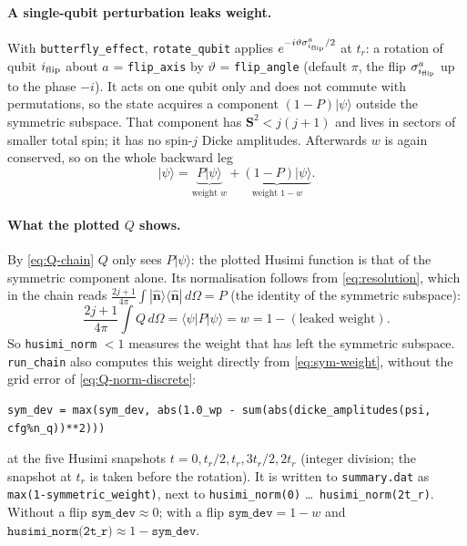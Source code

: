 \documentclass[11pt,a4paper]{article}
\newcommand{\vS}{\bm{S}}
\newcommand{\vn}{\hat{\bm n}}
\begin{document}
\paragraph{A single-qubit perturbation leaks weight.} With \texttt{butterfly\_effect}, \texttt{rotate\_qubit} applies
$e^{-i\vartheta\sigma^a_{i_{\rm flip}}/2}$ at $t_r$: a rotation of qubit $i_{\rm flip}$ about $a$ = \texttt{flip\_axis}
by $\vartheta$ = \texttt{flip\_angle} (default $\pi$, the flip $\sigma^a_{i_{\rm flip}}$ up to the phase $-i$). It acts on
one qubit only and does not commute with permutations, so the state acquires a component $(1-P)|\psi\rangle$ outside the
symmetric subspace. That component has $\vS^2 < j(j+1)$ and lives in sectors of smaller total spin; it has no spin-$j$
Dicke amplitudes. Afterwards $w$ is again conserved, so on the whole backward leg
\begin{equation}
  |\psi\rangle = \underbrace{P|\psi\rangle}_{\text{weight } w} + \underbrace{(1-P)|\psi\rangle}_{\text{weight } 1-w} .
\end{equation}

\paragraph{What the plotted $Q$ shows.} By \eqref{eq:Q-chain} $Q$ only sees $P|\psi\rangle$: the plotted Husimi
function is that of the symmetric component alone. Its normalisation follows from \eqref{eq:resolution}, which in the
chain reads $\frac{2j+1}{4\pi}\int|\vn\rangle\langle\vn|\,d\Omega = P$ (the identity of the symmetric subspace):
\begin{equation}\label{eq:Q-chain-norm}
  \frac{2j+1}{4\pi}\int Q\,d\Omega = \langle\psi|P|\psi\rangle = w = 1 - (\text{leaked weight}) .
\end{equation}
So \texttt{husimi\_norm} $<1$ measures the weight that has left the symmetric subspace. \texttt{run\_chain} also
computes this weight directly from \eqref{eq:sym-weight}, without the grid error of \eqref{eq:Q-norm-discrete}:
\begin{lstlisting}
sym_dev = max(sym_dev, abs(1.0_wp - sum(abs(dicke_amplitudes(psi, cfg%n_q))**2)))
\end{lstlisting}
at the five Husimi snapshots $t = 0, t_r/2, t_r, 3t_r/2, 2t_r$ (integer division; the snapshot at $t_r$ is taken
before the rotation). It is written to \texttt{summary.dat} as \texttt{max(1-symmetric\_weight)}, next to
\texttt{husimi\_norm(0)} \dots\ \texttt{husimi\_norm(2t\_r)}. Without a flip $\texttt{sym\_dev}\approx0$; with a flip $\texttt{sym\_dev} = 1-w$ and
$\texttt{husimi\_norm(2t\_r)}\approx 1-\texttt{sym\_dev}$.
\end{document}
